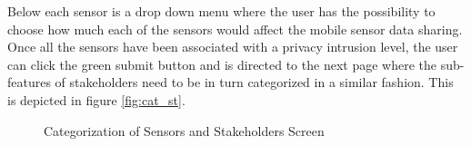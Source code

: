 Below each sensor is a drop down menu where the user has the possibility to choose how much each of the sensors
would affect the mobile sensor data sharing. Once all the sensors have been associated with a privacy intrusion level, the user can click the green submit button and is directed to
the next page where the sub-features of stakeholders need to be in turn categorized in a similar fashion. This is depicted in
figure \ref{fig:cat_st}.

\begin{figure}[htp]
  \hspace{1em}
  \caption{Categorization of Sensors and Stakeholders Screen}
  \label{fig:cat1}
\end{figure}

